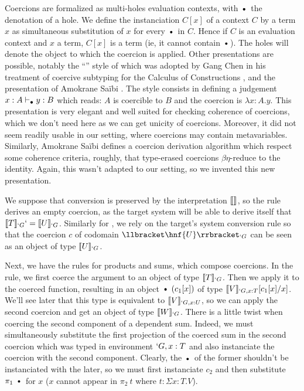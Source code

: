 \documentclass{llncs}
\begin{document}

Coercions are formalized as multi-holes evaluation contexts, with
$\ctxdot$ the denotation of a hole. We define the instanciation $C[x]$ of a context $C$
by a term $x$ as simultaneous substitution of $x$ for every $\ctxdot$ in $C$.
Hence if $C$ is an evaluation context and $x$ a term, $C[x]$ is a term
(ie, it cannot contain $\ctxdot$).
The holes will denote the object to which the coercion is applied. Other
presentations are possible, notably the ``\LMS{}'' style of \cite{longo95logic} which
was adopted by Gang Chen in his treatment of coercive subtyping for the
Calculus of Constructions \cite{conf/popl/Chen03}, and the presentation 
of Amokrane Sa\"ibi \cite{saibi97inheritance}. The \LMS{} style consists
in defining a judgement $x : A \vdash_{\bullet} y : B$ which reads: $A$ is
coercible to $B$ and the coercion is $\lambda x : A.y$. This
presentation is very elegant and well suited for checking coherence 
of coercions, which we don't need here as we can get unicity
of coercions. Moreover, it did not seem readily usable in
our setting, where coercions may contain metavariables. Similarly, Amokrane Sa\"ibi defines
a coercion derivation algorithm which respect some coherence criteria,
roughly, that type-erased coercions $\beta\eta$-reduce to the
identity. Again, this wasn't adapted to our setting, so we invented this
new presentation. 

We suppose that conversion is preserved by the interpretation $\llbracket  \rrbracket_{}$, so
the rule  derives an empty coercion, as the target system
will be able to derive itself that $\llbracket T \rrbracket_{`G} `= \llbracket U \rrbracket_{`G}$.
Similarly for , we rely on the target's system conversion
rule so that the coercion $c$ of codomain $\ip{\hnf{U}}{`G}$ can be seen
as an object of type $\llbracket U \rrbracket_{`G}$.

Next, we have the rules for products and sums, which compose
coercions. In the  rule, we first coerce the argument to
an object of type $\llbracket T \rrbracket_{`G}$. Then we apply it to the coerced
function, resulting in an object $\ctxdot~(c_1[x])$ of type
$\llbracket V \rrbracket_{`G, x : T}[c_1[x]/x]$. We'll see later that this type is equivalent to
$\llbracket V \rrbracket_{`G, x : U}$, so we can apply the second coercion and get an
object of type $\llbracket W \rrbracket_{`G}$. There is a little twist when coercing the
second component of a dependent sum. Indeed, we must simultaneously
substitute the first projection of the coerced sum in the second
coercion which was typed in environment $`G, x : T$ and also instanciate
the coercion with the second component. Clearly, the $\ctxdot$ of the
former shouldn't be instanciated with the later, so we must first
instanciate $c_2$ and then substitute $\pi_1~\ctxdot$ for $x$ 
($x$ cannot appear in $\pi_2~t$ where $t : \Sigma x : T.V$).
\end{document}
